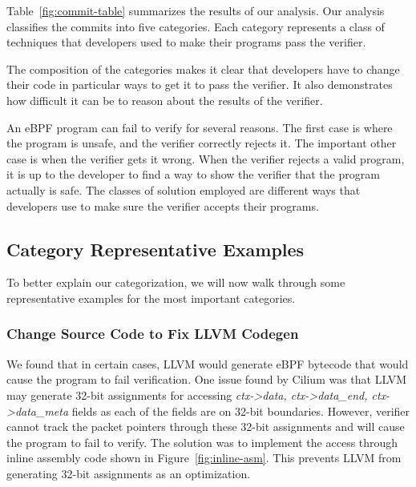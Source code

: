 Table~\ref{fig:commit-table} summarizes the results of our analysis.
Our analysis classifies the commits into five categories.
Each category represents a class of techniques that developers used to make their programs pass the verifier.


The composition of the categories makes it clear that developers have to change their code in particular ways to get it to pass the verifier.
It also demonstrates how difficult it can be to reason about the results of the verifier.

An eBPF program can fail to verify for several reasons.
The first case is where the program is unsafe, and the verifier correctly rejects it.
The important other case is when the verifier gets it wrong.
When the verifier rejects a valid program, it is up to the developer to find a way to show the verifier that the program actually is safe.
The classes of solution employed are different ways that developers use to make sure the verifier accepts their programs.

\subsection{Category Representative Examples}
To better explain our categorization, we will now walk through some representative examples for the most important categories.

\subsubsection{Change Source Code to Fix LLVM Codegen}
We found that in certain cases, LLVM would generate eBPF bytecode that would cause the program to fail verification.
One issue found by Cilium was that LLVM may generate 32-bit assignments for 
    accessing \emph{ctx->data, ctx->data\_end, ctx->data\_meta} fields as 
    each of the fields are on 32-bit boundaries.
However, verifier cannot track the packet pointers through these 32-bit assignments and
    will cause the program to fail to verify.
The solution was to implement the access through inline assembly code shown in Figure~\ref{fig:inline-asm}.
This prevents LLVM from generating 32-bit assignments as an optimization.


